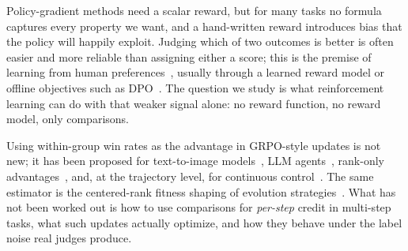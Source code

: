\documentclass[11pt]{article}
\theoremstyle{remark}
\begin{document}
Policy-gradient methods need a scalar reward, but for many tasks no formula captures every property we want, and a hand-written reward introduces bias that the policy will happily exploit. Judging which of two outcomes is better is often easier and more reliable than assigning either a score; this is the premise of learning from human preferences~\citep{christiano2017deep,ouyang2022instructgpt}, usually through a learned reward model or offline objectives such as DPO~\citep{rafailov2023dpo}. The question we study is what reinforcement learning can do with that weaker signal alone: no reward function, no reward model, only comparisons.

Using within-group win rates as the advantage in GRPO-style updates is not new; it has been proposed for text-to-image models~\citep{wang2025prefgrpo}, LLM agents~\citep{zhang2026arenarl,yang2026tournament}, rank-only advantages~\citep{choi2026gopo}, and, at the trajectory level, for continuous control~\citep{swamy2024minimaximalist}. The same estimator is the centered-rank fitness shaping of evolution strategies~\citep{wierstra2014nes,salimans2017es}. What has not been worked out is how to use comparisons for \emph{per-step} credit in multi-step tasks, what such updates actually optimize, and how they behave under the label noise real judges produce.
\end{document}
